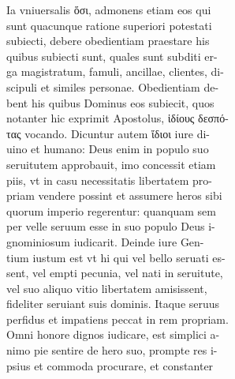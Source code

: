 \documentclass{article}
\begin{document}
\begin{pages}
                Ia vniuersalis ὅσι, admonens etiam eos qui \\
                sunt quacunque ratione superiori potestati \\
                subiecti, debere obedientiam praestare his \\
                quibus subiecti sunt, quales sunt subditi er- \\
                ga magistratum, famuli, ancillae, clientes, di- \\
                scipuli et similes personae. Obedientiam de- \\
                bent his quibus Dominus eos subiecit, quos \\
                notanter hic exprimit Apostolus, ἱδίους δεσπό- \\
                τας vocando. Dicuntur autem ἴδιοι iure di- \\
                uino et humano: Deus enim in populo suo \\
                seruitutem approbauit, imo concessit etiam \\
                piis, vt in casu necessitatis libertatem pro- \\
                priam vendere possint et assumere heros sibi \\
                quorum imperio regerentur: quanquam sem \\
                per velle seruum esse in suo populo Deus i- \\
                gnominiosum iudicarit. Deinde iure Gen- \\
                tium iustum est vt hi qui vel bello seruati es- \\
                sent, vel empti pecunia, vel nati in seruitute, \\
                vel suo aliquo vitio libertatem amisissent, \\
                fideliter seruiant suis dominis. Itaque seruus \\
                perfidus et impatiens peccat in rem propriam. \\
                Omni honore dignos iudicare, est simplici a- \\
                nimo pie sentire de hero suo, prompte res i- \\
                psius et commoda procurare, et constanter \\

\end{pages}
\end{document}
